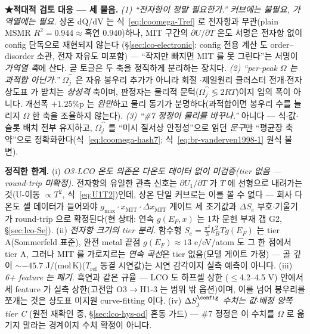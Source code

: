 \medskip
\textbf{★적대적 검토 대응 --- 세 물음.} \emph{(1) ``전자항이 정말 필요한가.''} \emph{커브에는 불필요, 가역열에는
필요.} 상온 dQ/dV 는 식~\eqref{eq:lcoomega-Tref} 로 전자항과 무관(plain MSMR $R^2{=}0.944\!\approx\!$흑연
$0.940$)하나, MIT 구간의 $\partial U/\partial T$ 온도 서명은 전자항 없이 config 단독으로 재현되지 않는다
(\S\ref{sec:lco-electronic}: config 전용 계산\cite{ml2024} 도 order--disorder 소관, 전자 자유도 미포함) --- ``작지만
빠지면 MIT 를 못 그린다''는 서명이 \emph{가역열 축}에 산다. 곧 토글은 두 축을 정직하게 분리하는 장치다.
\emph{(2) ``per-peak $\Omega$ 는 과적합 아닌가.''} $\Omega_j^\cat$ 은 자유 봉우리 추가가 아니라 회절
\cite{reimers1992}$\cdot$제일원리 클러스터 전개\cite{vanderven1998}$\cdot$전자 상도표\cite{motohashi2009} 가
받치는 \emph{상성격} 축이며, 판정자는 물리적 문턱($\Omega_j^\cat\!\lessgtr\!2RT$)이지 임의 폭이 아니다. 개선폭
$+1.25\%$p 는 \emph{완만}하고 물리 동기가 분명하다(과적합이면 봉우리 수를 늘리지 $\Omega$ 한 축을 조율하지 않는다).
\emph{(3) ``\#7 정정이 물리를 바꾸나.''} 아니다 --- 식$\cdot$값$\cdot$슬롯 배치 전부 유지하고, $\Omega_j^\cat$ 를
``미시 질서상 안정성''으로 읽던 \emph{문구}만 ``평균장 축약''으로 정확화한다(식~\eqref{eq:lcoomega-hash7};
식~\eqref{eq:br-vanderven1998-1} 원식 불변).

\begin{warnbox}
\textbf{정직한 한계.} (i) \emph{O3-LCO 온도 의존은 다온도 데이터 없이 미검증(tier 없음 --- round-trip 미확정).}
전자항의 유일한 관측 신호는 $\partial U_1/\partial T$ 가 $T$ 에 선형으로 내려가는 것(U-이동 $\propto T^2$,
식~\eqref{eq:U1T2})인데, 상온 단일 커브로는 이를 볼 수 없다 --- 회사 다온도 셀 데이터가 들어와야
$g_{\max}\cdot x_\mathrm{MIT}\cdot\Delta x_\mathrm{MIT}$ 게이트 세 초기값과 $\Delta S_e$ 부호$\cdot$기울기가
round-trip 으로 확정된다(현 상태: 연속 $g(E_F,x)$ 는 1차 문헌 부재 갭 G2, \S\ref{sec:lco-Se}). (ii) \emph{전자항
크기의 tier 분리.} 함수형 $S_e{=}\tfrac{\pi^2}{3}k_B^2Tg(E_F)$ 는 tier A(Sommerfeld 표준), 완전 metal 끝점
$g(E_F)\!\approx\!13$ e/eV/atom 도 그 한 점에서 tier A\cite{motohashi2009}, 그러나 MIT 를 가로지르는 \emph{연속
곡선}은 tier 없음(모델 게이트 가정) --- 골 깊이 $\sim-45.7$ J/(mol\,K)($T_\mathrm{ref}$ 동결 시연값)는 시연
감각이지 실측 예측이 아니다. (iii) \emph{6+ feature 는 폐기.} 흑연과 같은 규율 --- LCO 도 하프셀 상한
($\le$4.2--4.5 V) 안에서 세 feature 가 실측 상한(고전압 O3$\to$H1-3 는 범위 밖 옵션)이며, 이를 넘어 봉우리를
쪼개는 것은 상도표 미지원 curve-fitting 이다. (iv) \emph{$\Delta S_j^\config$ 수치는 값$\cdot$배정 양쪽 tier C}
(원전 재확인 중, \S\ref{sec:lco-hys-od} 혼동 가드) --- \#7 정정은 이 수치를 $\Omega$ 로 옮기지 말라는 경계이지
수치 확정이 아니다.
\end{warnbox}

